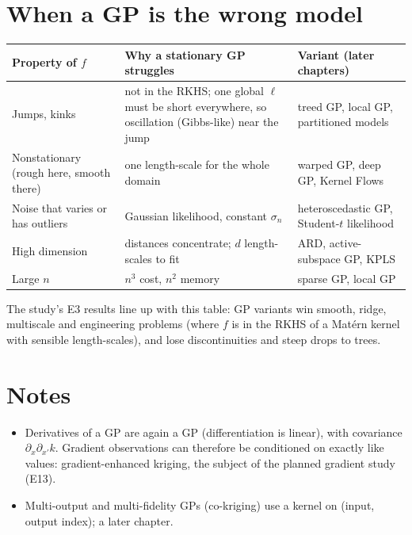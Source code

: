 \section{When a GP is the wrong model}

\begin{center}
\small
\begin{tabular}{p{4.1cm}p{5.3cm}p{4.2cm}}
\toprule
Property of $f$ & Why a stationary GP struggles & Variant (later chapters) \\
\midrule
Jumps, kinks & not in the RKHS; one global $\ell$ must be short everywhere, so oscillation (Gibbs-like) near the jump &
treed GP, local GP, partitioned models \\
Nonstationary (rough here, smooth there) & one length-scale for the whole domain & warped GP, deep GP, Kernel
Flows \\
Noise that varies or has outliers & Gaussian likelihood, constant $\sigma_n$ & heteroscedastic GP, Student-$t$
likelihood \\
High dimension & distances concentrate; $d$ length-scales to fit & ARD, active-subspace GP, KPLS \\
Large $n$ & $n^3$ cost, $n^2$ memory & sparse GP, local GP \\
\bottomrule
\end{tabular}
\end{center}

The study's E3 results line up with this table: GP variants win smooth, ridge, multiscale and engineering problems
(where $f$ is in the RKHS of a Mat\'ern kernel with sensible length-scales), and lose discontinuities and steep drops
to trees.

\section*{Notes}
\begin{itemize}[leftmargin=*,nosep]
  \item Derivatives of a GP are again a GP (differentiation is linear), with covariance $\partial_x\partial_{x'}k$.
        Gradient observations can therefore be conditioned on exactly like values: gradient-enhanced kriging, the
        subject of the planned gradient study (E13).
  \item Multi-output and multi-fidelity GPs (co-kriging) use a kernel on (input, output index); a later chapter.
\end{itemize}

